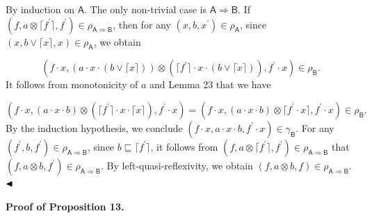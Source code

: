\documentclass[10pt,a4paper]{amsart}
\begin{document}
By induction on $\mathsf{A}$. The only non-trivial case is $\mathsf{A}\Rightarrow\mathsf{B}$. If $(f,a\otimes\lceil f^{\prime}\rceil,f^{\prime})\in\rho_{\mathsf{A}\Rightarrow%
\mathsf{B}}$, then for any $(x,b,x^{\prime})\in\rho_{\mathsf{A}}$, since $(x,b\vee\lceil x\rceil,x)\in\rho_{\mathsf{A}}$, we obtain\par
    \[(f\cdot x,(a\cdot x\cdot(b\vee\lceil x\rceil))\otimes(\lceil f^{\prime}\rceil%
\cdot x\cdot(b\vee\lceil x\rceil)),f^{\prime}\cdot x)\in\rho_{\mathsf{B}}.\]    
It follows from monotonicity of $a$ and Lemma 23 that we have\par
    \[(f\cdot x,(a\cdot x\cdot b)\otimes(\lceil f^{\prime}\rceil\cdot x\cdot\lceil x%
\rceil),f^{\prime}\cdot x)=(f\cdot x,(a\cdot x\cdot b)\otimes\lceil f^{\prime}%
\cdot x\rceil,f^{\prime}\cdot x)\in\rho_{\mathsf{B}}.\]    
By the induction hypothesis, we conclude $(f\cdot x,a\cdot x\cdot b,f^{\prime}\cdot x)\in\gamma_{\mathsf{B}}$. For any $(f^{\prime},b,f^{\prime})\in\rho_{\mathsf{A}\Rightarrow\mathsf{B}}$, since $b\sqsubseteq\lceil f^{\prime}\rceil$, it follows from $(f,a\otimes\lceil f^{\prime}\rceil,f^{\prime})\in\rho_{\mathsf{A}\Rightarrow%
\mathsf{B}}$ that $(f,a\otimes b,f^{\prime})\in\rho_{\mathsf{A}\Rightarrow\mathsf{B}}$. By left-quasi-reflexivity, we obtain $(f,a\otimes b,f)\in\rho_{\mathsf{A}\Rightarrow\mathsf{B}}$. $\hfill\blacktriangleleft$\par
 
 
 
 
\par\medskip\noindent\textbf{Proof of Proposition 13.}\par
 
 
\end{document}
